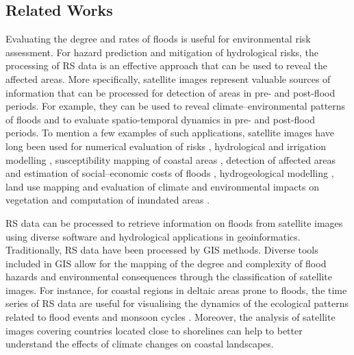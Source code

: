 \documentclass[water,article,accept,pdftex,oneauhor]{Definitions/mdpi}
\begin{document}
\subsection{Related Works}

Evaluating the degree and rates of floods {is useful for environmental risk assessment. }For hazard prediction and mitigation of hydrological risks{, the processing of RS data is an effective approach that can be used to reveal the affected areas. More specifically, }satellite images{ represent} valuable sources of information that can be {processed for detection of areas in pre- and post-flood periods. For example, }they can{ }be used to reveal climate--environmental patterns of floods {and} to evaluate spatio-temporal dynamics in pre- and post-flood periods. To mention a few {examples of such applications}, satellite images have long been used for{ }numerical evaluation of risks \citep{THAKUR2024130683}, hydrological and irrigation modelling \cite{SUN2024415}, susceptibility mapping of coastal areas \cite{RAZAVITERMEH2023100595}, detection of affected areas and estimation of social--economic costs of floods \cite{ZHENG2023101410,DUAN2024131010}, hydrogeological modelling \cite{BELL2021107451}, land use mapping and evaluation of climate and environmental impacts on vegetation \cite{JARAMILLO2024526} and computation of inundated areas \cite{ZUO2024}.

RS data can be processed to retrieve information on floods from satellite images using diverse {software and hydrological applications in geoinformatics}. {Traditionally, RS data have been processed by GIS methods.} Diverse tools included in GIS allow for the mapping of the degree and complexity of flood hazards and environmental consequences through the classification of satellite images. For instance, for coastal regions in deltaic areas prone to floods, {the} time series of RS data {are useful} for visualising the dynamics of the ecological patterns related to flood events and monsoon cycles \citep{RAZAVITERMEH2023100595,SINGHA2023316,MATHEW2021100861}. Moreover, the analysis of satellite images covering countries located close to shorelines can help to better understand the effects of climate changes on coastal landscapes{.}  
\end{document}
